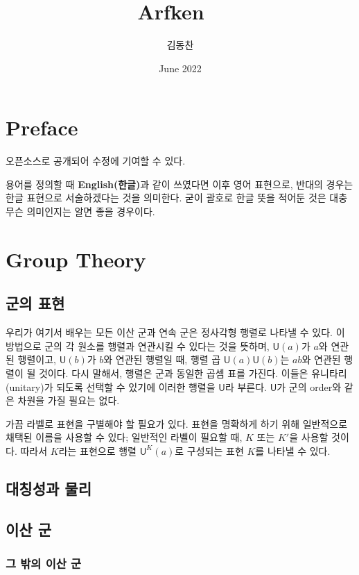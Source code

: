\documentclass{book}
\title{{\bfseries Arfken} \ }
\author{김동찬}
\date{June 2022}
\theoremstyle{definition}
\begin{document}
	
	\chapter*{Preface}
	오픈소스로 공개되어 수정에 기여할 수 있다.
	
	용어를 정의할 때 \textbf{English(한글)}과 같이 쓰였다면 이후 영어 표현으로, 반대의 경우는 한글 표현으로 서술하겠다는 것을 의미한다. 굳이 괄호로 한글 뜻을 적어둔 것은 대충 무슨 의미인지는 알면 좋을 경우이다.
	
	\setcounter{chapter}{16}
	\chapter{ Group Theory}
	
	
	
	\section{군의 표현}
	
	우리가 여기서 배우는 모든 이산 군과 연속 군은 정사각형 행렬로 나타낼 수 있다. 이 방법으로 군의 각 원소를 행렬과 연관시킬 수 있다는 것을 뜻하며, $\mathsf{U}(a)$가 $a$와 연관된 행렬이고, $\mathsf{U}(b)$가 $b$와 연관된 행렬일 때, 행렬 곱 $\mathsf{U}(a)\mathsf{U}(b)$는 $ab$와 연관된 행렬이 될 것이다. 다시 말해서, 행렬은 군과 동일한 곱셈 표를 가진다. 이들은 유니타리(unitary)가 되도록 선택할 수 있기에 이러한 행렬을 $\mathsf{U}$라 부른다. $\mathsf{U}$가 군의 order와 같은 차원을 가질 필요는 없다.
	
	가끔 라벨로 표현을 구별해야 할 필요가 있다. 표현을 명확하게 하기 위해 일반적으로 채택된 이름을 사용할 수 있다; 일반적인 라벨이 필요할 때, $K$ 또는 $K'$을 사용할 것이다. 따라서 $K$라는 표현으로 행렬 $\mathsf{U}^K(a)$로 구성되는 표현 $K$를 나타낼 수 있다.
	
	
	
	
	\section{대칭성과 물리}
	
	\section{이산 군}
	
	\subsection{그 밖의 이산 군}
	
\end{document}
